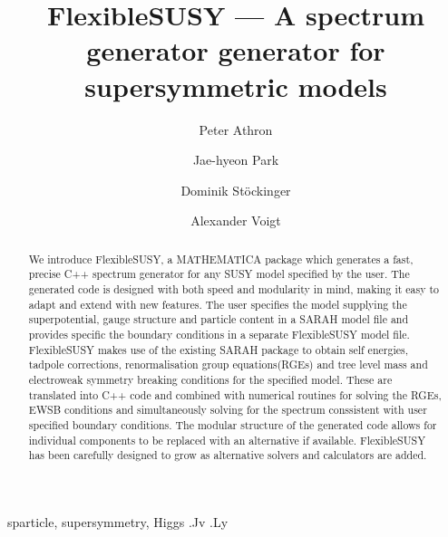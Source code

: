 \documentclass[final,3p,11pt,pdflatex]{elsarticle}
\newcommand{\sarah}{SARAH\xspace}
\newcommand{\fs}{FlexibleSUSY\xspace}
\begin{document}
\begin{frontmatter}

 \title{\Large\bf FlexibleSUSY --- A spectrum generator generator for supersymmetric models}

\author[adelaide]{Peter Athron}
\author[dresden]{Jae-hyeon Park}
\author[dresden]{Dominik St\"ockinger}
\author[dresden]{Alexander Voigt}
\address[adelaide]{ARC Centre of Excellence for Particle Physics at 
the Tera-scale, School of Chemistry and Physics, University of Adelaide, 
Adelaide SA 5005 Australia}
\address[dresden]{Institut f\"ur Kern- und Teilchenphysik,
TU Dresden, Zellescher Weg 19, 01069 Dresden, Germany}
   
  \begin{abstract}
   We introduce \fs, a MATHEMATICA package which generates a fast,
   precise C++ spectrum generator for any SUSY model specified by the
   user.  The generated code is designed with both speed and
   modularity in mind, making it easy to adapt and extend with new
   features. The user specifies the model supplying the
   superpotential, gauge structure and particle content in a \sarah
   model file and provides specific the boundary conditions in a
   separate \fs model file. \fs makes use of the existing \sarah
   package to obtain self energies, tadpole corrections,
   renormalisation group equations(RGEs) and tree level mass and
   electroweak symmetry breaking conditions for the specified model. These are
   translated into C++ code and combined  with numerical
   routines for solving the RGEs, EWSB conditions and simultaneously
   solving for the spectrum conssistent with user specified boundary
   conditions.  The modular structure of the generated code allows for
   individual components to be replaced with an alternative if
   available. \fs has been carefully designed to grow as
   alternative solvers and calculators are added.
  \end{abstract}

\begin{keyword}
sparticle, 
supersymmetry, 
Higgs
.Jv
.Ly
\end{keyword}
\end{frontmatter}
\end{document}
